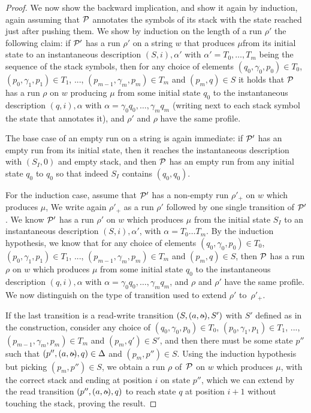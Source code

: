 \begin{proof}
        We now show the backward implication, and show it again by induction,
        again assuming that $\mathcal{P}$ annotates the symbols of its stack with the
        state reached just after pushing them. We
        show by induction on the length of a run $\rho'$ the following claim: if
        $\mathcal{P}'$ has a run $\rho'$ on a string $w$ that produces $\mu$from its initial state to an instantaneous
        description $(S, i), \alpha'$ with $\alpha' =
        T_0, \ldots, T_m$ being the sequence of the stack
        symbols, then for any choice of elements $(q_0, \gamma_0, p_0) \in T_0$,
        $(p_0, \gamma_1, p_1) \in T_1$, ..., $(p_{m-1}, \gamma_m, p_m) \in T_m$
        and $(p_m, q) \in S$ it holds that $\mathcal{P}$ has a run $\rho$ on $w$ producing $\mu$
        from some initial state $q_0$ to the instantaneous description $(q, i), \alpha$ with
        $\alpha = \gamma_0 q_0, \ldots, \gamma_m q_m$ (writing next to each
        stack symbol the state that annotates it), and $\rho'$ and $\rho$ have
        the same profile.

        The base case of an empty run on a string is again immediate: if $\mathcal{P}'$ has an
        empty run from its initial state, then it reaches the instantaneous
        description with $(S_I, 0)$ and empty stack, and then $\mathcal{P}$
        has an empty run from any initial state $q_0$ to $q_0$ so that indeed
        $S_I$ contains $(q_0, q_0)$.

        For the induction case, assume that $\mathcal{P}'$ has a non-empty run $\rho'_+$ on $w$ which produces $\mu$,
        We write again $\rho'_+$ as a run $\rho'$ followed by one single transition
        of $\mathcal{P}'$. We know $\mathcal{P}'$ has a run $\rho'$ on $w$ which produces $\mu$ from the initial
        state $S_I$ to an instantaneous description $(S, i), \alpha'$,
        with $\alpha = T_0 \ldots T_m$.
        By the induction hypothesis, we know that for any choice of elements
        $(q_0, \gamma_0, p_0) \in T_0$,
        $(p_0, \gamma_1, p_1) \in T_1$, ..., $(p_{m-1}, \gamma_m, p_m) \in T_m$
        and $(p_m, q) \in S$, 
        then $\mathcal{P}$ has a run $\rho$ on $w$ which produces $\mu$
        from some initial state $q_0$ to the instantaneous description $(q, i), \alpha$ with
        $\alpha = \gamma_0 q_0, \ldots, \gamma_m q_m$, and $\rho$ and $\rho'$
        have the same profile.
        We now distinguish on the type of transition used to extend $\rho'$
        to~$\rho'_+$. 

        If the last transition is a read-write transition $(S, (a, \oout), S')$ with $S'$
        defined as in the construction, consider any choice of 
        $(q_0, \gamma_0, p_0) \in T_0$,
        $(p_0, \gamma_1, p_1) \in T_1$, ..., $(p_{m-1}, \gamma_m, p_m) \in T_m$
        and $(p_m, q') \in S'$, and then there must be some state $p''$ such that
        $(p'', (a, \oout), q) \in \Delta$ and $(p_m, p'') \in S$. Using the
        induction hypothesis but picking $(p_m, p'') \in S$, we obtain a run
        $\rho$ of~$\mathcal{P}$ on $w$ which produces $\mu$, with the correct stack and ending at
        position $i$ on state $p''$, which we can extend by the read transition
        $(p'', (a, \oout), q)$ to reach state $q$ at position $i+1$ without
        touching the stack, proving the result.
        

\end{proof}
